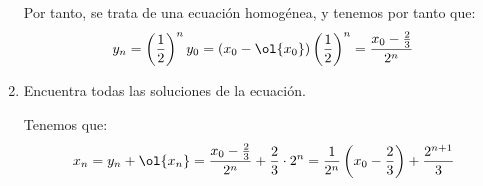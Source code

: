 \begin{ejercicio*}
\begin{enumerate}
        Por tanto, se trata de una ecuación homogénea, y tenemos por tanto que:
        \begin{equation*}
            y_n = \left(\frac{1}{2}\right)^ny_0
            = (x_0 - \ol{x_0})\left(\frac{1}{2}\right)^n
            = \frac{x_0-\frac{2}{3}}{2^n}
        \end{equation*}
        
        \item Encuentra todas las soluciones de la ecuación.

        Tenemos que:
        \begin{equation*}
            x_n = y_n + \ol{x_n}
            = \frac{x_0-\frac{2}{3}}{2^n} + \frac{2}{3}\cdot 2^n
            = \frac{1}{2^n}\left(x_0 - \frac{2}{3}\right)+\frac{2^{n+1}}{3}
        \end{equation*}
    \end{enumerate}
\end{ejercicio*}

